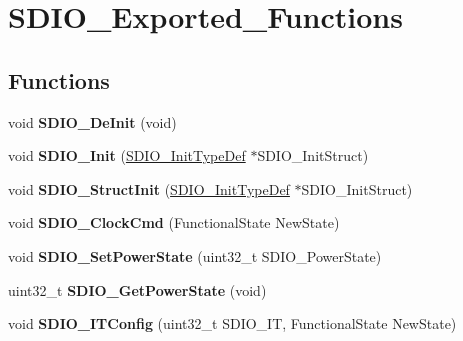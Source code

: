 \hypertarget{group__SDIO__Exported__Functions}{
\section{SDIO\_\-Exported\_\-Functions}
\label{group__SDIO__Exported__Functions}
}
\subsection*{Functions}
\begin{DoxyCompactItemize}
\item 
\hypertarget{group__SDIO__Exported__Functions_gac359d2c6c67a2590f8f9b720c0e4ff1b}{
void {\bfseries SDIO\_\-DeInit} (void)}
\label{group__SDIO__Exported__Functions_gac359d2c6c67a2590f8f9b720c0e4ff1b}

\item 
\hypertarget{group__SDIO__Exported__Functions_gad40764a8e37c0ed5c9141ae338ff0203}{
void {\bfseries SDIO\_\-Init} (\hyperlink{structSDIO__InitTypeDef}{SDIO\_\-InitTypeDef} $\ast$SDIO\_\-InitStruct)}
\label{group__SDIO__Exported__Functions_gad40764a8e37c0ed5c9141ae338ff0203}

\item 
\hypertarget{group__SDIO__Exported__Functions_ga778d338c29df4fae9ef69432e6df32ad}{
void {\bfseries SDIO\_\-StructInit} (\hyperlink{structSDIO__InitTypeDef}{SDIO\_\-InitTypeDef} $\ast$SDIO\_\-InitStruct)}
\label{group__SDIO__Exported__Functions_ga778d338c29df4fae9ef69432e6df32ad}

\item 
\hypertarget{group__SDIO__Exported__Functions_ga7243b857d6b323748ff3a493b265bedc}{
void {\bfseries SDIO\_\-ClockCmd} (FunctionalState NewState)}
\label{group__SDIO__Exported__Functions_ga7243b857d6b323748ff3a493b265bedc}

\item 
\hypertarget{group__SDIO__Exported__Functions_ga36ecca32b904de74218fbe65cd5f5270}{
void {\bfseries SDIO\_\-SetPowerState} (uint32\_\-t SDIO\_\-PowerState)}
\label{group__SDIO__Exported__Functions_ga36ecca32b904de74218fbe65cd5f5270}

\item 
\hypertarget{group__SDIO__Exported__Functions_ga3a19de2c7cd51645702213f64a1758ed}{
uint32\_\-t {\bfseries SDIO\_\-GetPowerState} (void)}
\label{group__SDIO__Exported__Functions_ga3a19de2c7cd51645702213f64a1758ed}

\item 
\hypertarget{group__SDIO__Exported__Functions_ga208f51237ef43288735829dbaed37f00}{
void {\bfseries SDIO\_\-ITConfig} (uint32\_\-t SDIO\_\-IT, FunctionalState NewState)}
\label{group__SDIO__Exported__Functions_ga208f51237ef43288735829dbaed37f00}


\end{DoxyCompactItemize}
